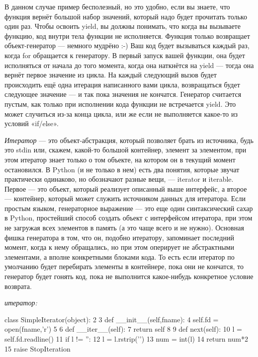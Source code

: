 В данном случае пример бесполезный, но это удобно, если вы знаете, что функция вернёт большой набор значений, который надо будет прочитать только один раз.
Чтобы освоить yield, вы должны понимать, что когда вы вызываете функцию, код внутри тела функции не исполняется. Функция только возвращает объект-генератор — немного мудрёно :-)
Ваш код будет вызываться каждый раз, когда for обращается к генератору.
В первый запуск вашей функции, она будет исполняться от начала до того момента, когда она наткнётся на yield — тогда она вернёт первое значение из цикла. На каждый следующий вызов будет происходить ещё одна итерация написанного вами цикла, возвращаться будет следующее значение — и так пока значения не кончатся.
Генератор считается пустым, как только при исполнении кода функции не встречается yield. Это может случиться из-за конца цикла, или же если не выполняется какое-то из условий «if/else».

\textit{Итератор} — это объект-абстракция, который позволяет брать из источника, будь это stdin или, скажем, какой-то большой контейнер, элемент за элементом, при этом итератор знает только о том объекте, на котором он в текущий момент остановился.
В Python (и не только в нем) есть два понятия, которые звучат практически одинаково, но обозначают разные вещи, — iterator и iterable. Первое — это объект, который реализует описанный выше интерфейс, а второе — контейнер, который может служить источником данных для итератора.
Если простым языком, генераторное выражение — это еще один синтаксический сахар в Python, простейший способ создать объект с интерфейсом итератора, при этом не загружая всех элементов в память (а это чаще всего и не нужно).
Основная фишка генератора в том, что он, подобно итератору, запоминает последний момент, когда к нему обращались, но при этом оперирует не абстрактными элементами, а вполне конкретными блоками кода. То есть если итератор по умолчанию будет перебирать элементы в контейнере, пока они не кончатся, то генератор будет гонять код, пока не выполнится какое-нибудь конкретное условие возврата.

\textit{итератор:}
\begin{python}
class SimpleIterator(object):
 2
 3     def __init__(self,fname):
 4         self.fd = open(fname,'r')
 5
 6     def __iter__(self):
 7         return self
 8
 9     def next(self):
10         l = self.fd.readline()
11         if l != '':
12             l = l.rstrip('\n')
13             num = int(l)
14             return num*2
15         raise StopIteration
\end{python}

